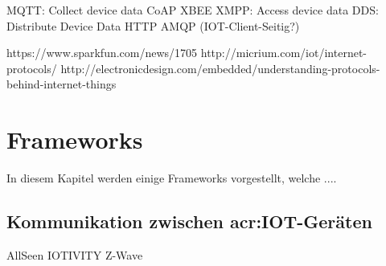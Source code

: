MQTT: Collect device data
CoAP
XBEE
XMPP: Access device data
DDS: Distribute Device Data
HTTP
AMQP (IOT-Client-Seitig?)

https://www.sparkfun.com/news/1705
http://micrium.com/iot/internet-protocols/
http://electronicdesign.com/embedded/understanding-protocols-behind-internet-things

\section{Frameworks}
In diesem Kapitel werden einige Frameworks vorgestellt, welche ....


\subsection{Kommunikation zwischen \gls{acr:IOT}-Geräten}
AllSeen
IOTIVITY
Z-Wave